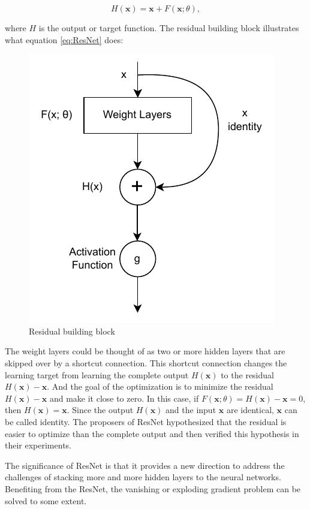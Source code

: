 \documentclass[
	parskip, 			   %
	twoside, 			   %
	DIV=14, 			   %
	BCOR=15.0mm, 		   %
	headsepline, 		   %
	open=right, 		   %
	captions=tableheading, %
	bibliography=totoc,    %
	numbers=noenddot       %
]{scrreprt}
\begin{document}
\begin{equation}
    \label{eq:ResNet}
    H(\mathbf{x})=\mathbf{x}+F(\mathbf{x};\theta),
\end{equation}

where $H$ is the output or target function. The residual building block illustrates what equation \ref{eq:ResNet} does:

\clearpage
\begin{figure}[htbp!]
    \centering
    \includegraphics[scale=1]{figures/ResNet.pdf}
    \caption{Residual building block}
    \label{fig:ResNet}
\end{figure}

The weight layers could be thought of as two or more hidden layers that are skipped over by a shortcut connection. This shortcut connection changes the learning target from learning the complete output $H(\mathbf{x})$ to the residual $H(\mathbf{x})-\mathbf{x}$. And the goal of the optimization is to minimize the residual $H(\mathbf{x})-\mathbf{x}$ and make it close to zero. In this case, if $F(\mathbf{x};\theta)=H(\mathbf{x})-\mathbf{x}=0$, then $H(\mathbf{x})=\mathbf{x}$. Since the output $H(\mathbf{x})$ and the input $\mathbf{x}$ are identical, $\mathbf{x}$ can be called identity. The proposers of ResNet hypothesized that the residual is easier to optimize than the complete output and then verified this hypothesis in their experiments. 

 The significance of ResNet is that it provides a new direction to address the challenges of stacking more and more hidden layers to the neural networks. Benefiting from the ResNet, the vanishing or exploding gradient problem can be solved to some extent.
\end{document}
